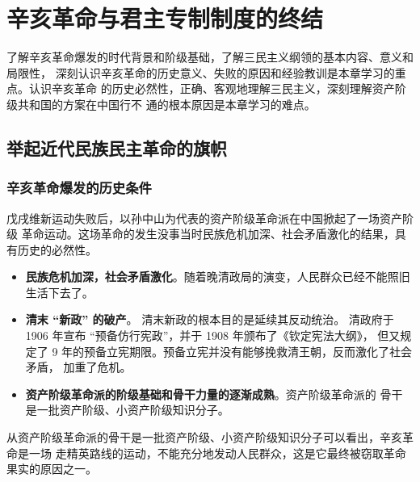 \documentclass[10pt, UTF8]{book} %
\begin{document}

\clearpage
\thispagestyle{empty}

\chapter{辛亥革命与君主专制制度的终结}
\thispagestyle{empty}

\quad\quad 
了解辛亥革命爆发的时代背景和阶级基础，了解三民主义纲领的基本内容、意义和局限性，
深刻认识辛亥革命的历史意义、失败的原因和经验教训是本章学习的重点。认识辛亥革命
的历史必然性，正确、客观地理解三民主义，深刻理解资产阶级共和国的方案在中国行不
通的根本原因是本章学习的难点。

\section{举起近代民族民主革命的旗帜}
\subsection{辛亥革命爆发的历史条件}

戊戌维新运动失败后，以孙中山为代表的资产阶级革命派在中国掀起了一场资产阶级
革命运动。这场革命的发生没事当时民族危机加深、社会矛盾激化的结果，具有历史的必然性。
\begin{itemize}[itemsep=0pt]
    \item \textbf{民族危机加深，社会矛盾激化}。随着晚清政局的演变，人民群众已经不能照旧
    生活下去了。
    \item \textbf{清末 “新政” 的破产}。
    清末新政的根本目的是延续其反动统治。
    清政府于 1906 年宣布 “预备仿行宪政”，并于 1908 年颁布了《钦定宪法大纲》，
    但又规定了 9 年的预备立宪期限。预备立宪并没有能够挽救清王朝，反而激化了社会矛盾，
    加重了危机。
    \item \textbf{资产阶级革命派的阶级基础和骨干力量的逐渐成熟}。资产阶级革命派的
    骨干是一批资产阶级、小资产阶级知识分子。
\end{itemize}
\begin{remark}
    从资产阶级革命派的骨干是一批资产阶级、小资产阶级知识分子可以看出，辛亥革命是一场
    走精英路线的运动，不能充分地发动人民群众，这是它最终被窃取革命果实的原因之一。
\end{remark}
\end{document}
